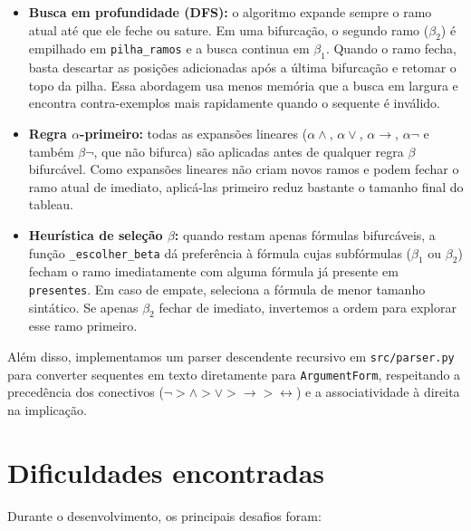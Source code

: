 \documentclass{article}
\begin{document}
\begin{itemize}
    \item \textbf{Busca em profundidade (DFS):} o algoritmo expande sempre o ramo atual até que ele feche ou sature. Em uma bifurcação, o segundo ramo ($\beta_2$) é empilhado em \texttt{pilha\_ramos} e a busca continua em $\beta_1$. Quando o ramo fecha, basta descartar as posições adicionadas após a última bifurcação e retomar o topo da pilha. Essa abordagem usa menos memória que a busca em largura e encontra contra-exemplos mais rapidamente quando o sequente é inválido.
    \item \textbf{Regra $\alpha$-primeiro:} todas as expansões lineares ($\alpha\land$, $\alpha\lor$, $\alpha\to$, $\alpha\neg$ e também $\beta\neg$, que não bifurca) são aplicadas antes de qualquer regra $\beta$ bifurcável. Como expansões lineares não criam novos ramos e podem fechar o ramo atual de imediato, aplicá-las primeiro reduz bastante o tamanho final do tableau.
    \item \textbf{Heurística de seleção $\beta$:} quando restam apenas fórmulas bifurcáveis, a função \texttt{\_escolher\_beta} dá preferência à fórmula cujas subfórmulas ($\beta_1$ ou $\beta_2$) fecham o ramo imediatamente com alguma fórmula já presente em \texttt{presentes}. Em caso de empate, seleciona a fórmula de menor tamanho sintático. Se apenas $\beta_2$ fechar de imediato, invertemos a ordem para explorar esse ramo primeiro.
\end{itemize}

Além disso, implementamos um parser descendente recursivo em \texttt{src/parser.py} para converter sequentes em texto diretamente para \texttt{ArgumentForm}, respeitando a precedência dos conectivos ($\neg > \land > \lor > \to > \leftrightarrow$) e a associatividade à direita na implicação.

\section*{Dificuldades encontradas}

Durante o desenvolvimento, os principais desafios foram:
\end{document}
